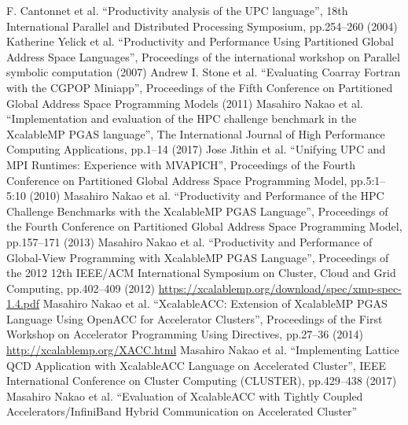 \begin{thebibliography}{99.}%
%
%
 F. Cantonnet et al.
  ``Productivity analysis of the UPC language'', 18th International Parallel and Distributed Processing Symposium, pp.254--260 (2004)
%
 Katherine Yelick et al.
  ``Productivity and Performance Using Partitioned Global Address Space Languages'', Proceedings of the international workshop on Parallel symbolic computation (2007)
%
 Andrew I. Stone et al.
``Evaluating Coarray Fortran with the CGPOP Miniapp'', Proceedings of the Fifth Conference on Partitioned Global Address Space Programming Models (2011)
%
 Masahiro Nakao et al.
``Implementation and evaluation of the HPC challenge benchmark in the XcalableMP PGAS language'',
The International Journal of High Performance Computing Applications, pp.1--14 (2017)
%
 Jose Jithin et al.
``Unifying UPC and MPI Runtimes: Experience with MVAPICH'',
Proceedings of the Fourth Conference on Partitioned Global Address Space Programming Model, pp.5:1--5:10 (2010)
%
 Masahiro Nakao et al.
``Productivity and Performance of the HPC Challenge Benchmarks with the XcalableMP PGAS Language'',
Proceedings of the Fourth Conference on Partitioned Global Address Space Programming Model, pp.157--171 (2013)
%
 Masahiro Nakao et al.
``Productivity and Performance of Global-View Programming with XcalableMP PGAS Language'',
Proceedings of the 2012 12th IEEE/ACM International Symposium on Cluster, Cloud and Grid Computing,
pp.402--409 (2012)
%
 \url{https://xcalablemp.org/download/spec/xmp-spec-1.4.pdf}
%
 Masahiro Nakao et al.
``XcalableACC: Extension of XcalableMP PGAS Language Using OpenACC for Accelerator Clusters'',
Proceedings of the First Workshop on Accelerator Programming Using Directives, pp.27--36 (2014)
%
 \url{http://xcalablemp.org/XACC.html}
%
 Masahiro Nakao et al.
``Implementing Lattice QCD Application with XcalableACC Language on Accelerated Cluster'',
IEEE International Conference on Cluster Computing (CLUSTER), pp.429--438 (2017)
%
 Masahiro Nakao et al.
  ``Evaluation of XcalableACC with Tightly Coupled Accelerators/InfiniBand Hybrid Communication on Accelerated Cluster''

\end{thebibliography}
